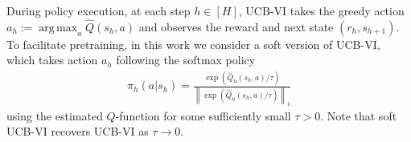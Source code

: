 \documentclass[10pt]{article}
\DeclareMathOperator*{\argmax}{arg\,max}
\newcommand{\norm}[1]{\left\|{#1}\right\|}
\newcommand{\lone}[1]{\norm{#1}_1}
\newcommand{\<}{\left\langle}
\renewcommand{\>}{\right\rangle}
\newcommand{\temp}{{\tau}}
\newcommand{\state}{{s}}
\newcommand{\action}{{a}}
\newcommand{\reward}{{r}}
\newcommand{\plc}{{\pi}}
\newcommand{\horizon}{{H}}
\renewcommand{\horizon}{{H}}
\newcommand{\Qfun}{{Q}}
\newcommand{\trestQfun}{{\widehat{\Qfun}}}
\begin{document}
During policy execution, at each step $h\in[\horizon]$, UCB-VI takes the greedy action $\action_h:=\argmax_{\action}\trestQfun(\state_h,\action)$ and observes the reward and next state $(\reward_h,\state_{h+1})$. To facilitate pretraining, in this work we consider a soft version of UCB-VI, which takes action $\action_h$  following the softmax policy
\begin{align*}
\plc_h(\action|\state_h)=\frac{\exp(\trestQfun_h(\state_h,\action)/\temp)}{\lone{\exp(\trestQfun_h(\state_h,\action)/\temp)}}
\end{align*}
using the estimated $Q$-function for some sufficiently small $\temp>0$. Note that soft UCB-VI recovers UCB-VI as $\temp\to 0$.
\end{document}
